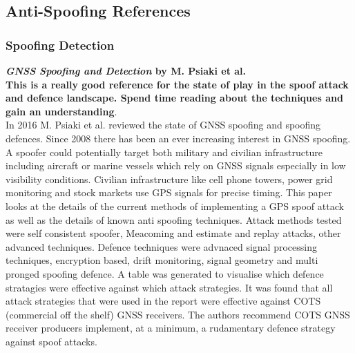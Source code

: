 \medskip

\subsection{Anti-Spoofing References}
\subsubsection{Spoofing Detection}

\textbf{\emph{GNSS Spoofing and Detection} by M. Psiaki et al.} \\
\textbf{This is a really good reference for the state of play in the spoof attack and defence landscape. Spend time reading about the techniques and 
gain an understanding}.\\
In 2016 M. Psiaki et al. \cite{RN12} reviewed the state of GNSS spoofing and spoofing defences. Since 2008 there has been an ever increasing 
interest in GNSS spoofing. A spoofer could potentially target both military and civilian infrastructure including aircraft or marine vessels which
rely on GNSS signals especially in low visibility conditions. Civilian infrastructure like cell phone towers, power grid monitoring and stock markets
use GPS signals for precise timing. This paper looks at the details of the current methods of implementing a GPS spoof attack as well as the details
of known anti spoofing techniques. Attack methods tested were self consistent spoofer, Meacoming and estimate and replay attacks, other advanced techniques.
Defence techniques were advnaced signal processing techniques, encryption based, drift monitoring, signal geometry and multi pronged spoofing defence.
A table was generated to visualise which defence stratagies were effective against which attack strategies. 
It was found that all attack strategies that were used in the report were effective against COTS (commercial off the shelf) GNSS receivers. The authors
recommend COTS GNSS receiver producers implement, at a minimum, a rudamentary defence strategy against spoof attacks. 

\medskip

